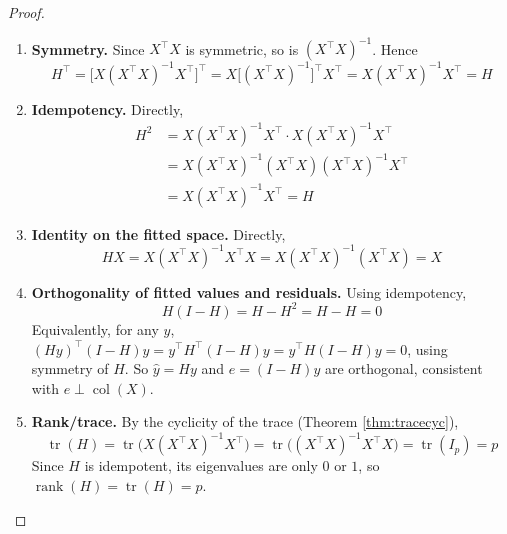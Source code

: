 \begin{proof}\leavevmode
    \begin{enumerate}
        \item \textbf{Symmetry.} Since $X^\top X$ is symmetric, so is $(X^\top X)^{-1}$. Hence
        \begin{equation*}
            H^\top = \big[X(X^\top X)^{-1}X^\top\big]^\top = X\big[(X^\top X)^{-1}\big]^\top X^\top = X(X^\top X)^{-1}X^\top = H
        \end{equation*}

        \item \textbf{Idempotency.} Directly,
        \begin{align*}
            H^2 &= X(X^\top X)^{-1}X^\top \cdot X(X^\top X)^{-1}X^\top \\
            &= X(X^\top X)^{-1}(X^\top X)(X^\top X)^{-1}X^\top \\
            &= X(X^\top X)^{-1}X^\top = H
        \end{align*}

        \item \textbf{Identity on the fitted space.} Directly,
        \begin{equation*}
            HX = X(X^\top X)^{-1}X^\top X = X(X^\top X)^{-1}(X^\top X) = X
        \end{equation*}

        \item \textbf{Orthogonality of fitted values and residuals.} Using idempotency,
        \begin{equation*}
            H(I-H) = H - H^2 = H - H = 0
        \end{equation*}
        Equivalently, for any $y$, $(Hy)^\top(I-H)y = y^\top H^\top(I-H)y = y^\top H(I-H)y = 0$, using symmetry of $H$. So $\hat y = Hy$ and $e=(I-H)y$ are orthogonal, consistent with $e \perp \operatorname{col}(X)$.

        \item \textbf{Rank/trace.} By the cyclicity of the trace (Theorem \ref{thm:tracecyc}),
        \begin{equation*}
            \operatorname{tr}(H) = \operatorname{tr}\big(X(X^\top X)^{-1}X^\top\big) = \operatorname{tr}\big((X^\top X)^{-1}X^\top X\big) = \operatorname{tr}(I_p) = p
        \end{equation*}
        Since $H$ is idempotent, its eigenvalues are only $0$ or $1$, so $\operatorname{rank}(H) = \operatorname{tr}(H) = p$.
    \end{enumerate}
\end{proof}

